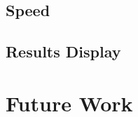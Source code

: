 \documentclass[senior]{IPSstyle}
\begin{document}
\section{Speed}
\section{Results Display}


\chapter{Future Work}\label{future work}
% 


\end{document}
